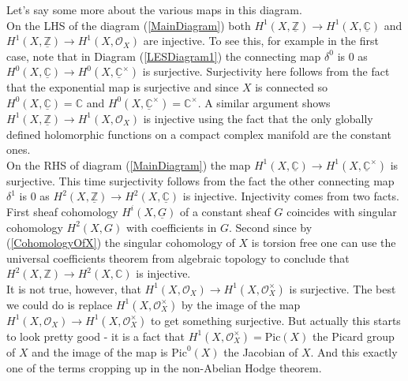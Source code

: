 Let's say some more about the various maps in this diagram.\\

On the LHS of the diagram (\ref{MainDiagram}) both $H^{1}(X,\underline{\mathbb{Z}})\rightarrow H^{1}(X,\underline{\mathbb{C}})$ and $H^{1}(X,\underline{\mathbb{Z}})\rightarrow H^{1}(X,\mathcal{O}_{X})$ are injective. To see this, for example in the first case, note that in Diagram (\ref{LESDiagram1}) the connecting map $\delta^{0}$ is $0$ as $H^{0}(X,\underline{\mathbb{C}})\rightarrow H^{0}(X,\underline{\mathbb{C}}^\times)$ is surjective. Surjectivity here follows from the fact that the exponential map is surjective and since $X$ is connected so $H^{0}(X,\underline{\mathbb{C}})=\mathbb{C}$ and $H^{0}(X,\underline{\mathbb{C}}^\times)=\mathbb{C}^\times$. A similar argument shows $H^{1}(X,\underline{\mathbb{Z}})\rightarrow H^{1}(X,\mathcal{O}_{X})$ is injective using the fact that the only globally defined holomorphic functions on a compact complex manifold are the constant ones.\\

On the RHS of diagram (\ref{MainDiagram}) the map $H^{1}(X,\underline{\mathbb{C}})\rightarrow H^{1}(X,\underline{\mathbb{C}}^\times)$ is surjective. This time surjectivity follows from the fact the other connecting map $\delta^{1}$ is $0$ as $H^{2}(X,\underline{\mathbb{Z}})\rightarrow H^{2}(X,\underline{\mathbb{C}})$ is injective. Injectivity comes from two facts. First sheaf cohomology $H^{i}(X,\underline{G})$ of a constant sheaf \underline{$G$} coincides with singular cohomology  $H^{2}(X,G)$ with coefficients in $G$. Second since by (\ref{CohomologyOfX}) the singular cohomology of $X$ is torsion free one can use the universal coefficients theorem from algebraic topology to conclude that $H^{2}(X,\mathbb{Z})\rightarrow H^{2}(X,\mathbb{C})$ is injective.\\

It is not true, however, that $H^{1}(X,\mathcal{O}_{X})\rightarrow H^{1}(X,\mathcal{O}_{X}^\times)$ is surjective. The best we could do is replace $H^{1}(X,\mathcal{O}_{X}^\times)$ by the image of the map $H^{1}(X,\mathcal{O}_{X})\rightarrow H^{1}(X,\mathcal{O}_{X}^\times)$ to get something surjective. But actually this starts to look pretty good -  it is a fact that $H^{1}(X,\mathcal{O}_{X}^\times)=\textrm{Pic}(X)$ the Picard group of $X$ and the image of the map is $\textrm{Pic}^{0}(X)$ the Jacobian of $X$. And this exactly one of the terms cropping up in the non-Abelian Hodge theorem.\\

